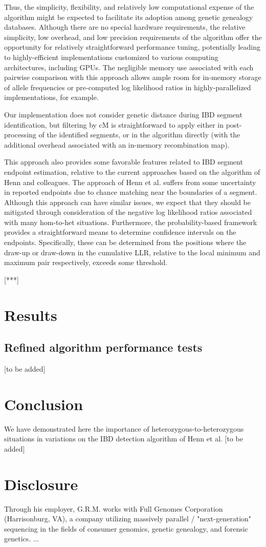\documentclass{article}
\begin{document}
Thus, the simplicity, flexibility, and relatively low computational expense of the algorithm might be expected to facilitate its adoption among genetic genealogy databases. Although there are no special hardware requirements, the relative simplicity, low overhead, and low precision requirements of the algorithm offer the opportunity for relatively straightforward performance tuning, potentially leading to highly-efficient implementations customized to various computing architectures, including GPUs. The negligible memory use associated with each pairwise comparison with this approach allows ample room for in-memory storage of allele frequencies or pre-computed log likelihood ratios in highly-parallelized implementations, for example.

Our implementation does not consider genetic distance during IBD segment identification, but filtering by cM is straightforward to apply either in post-processing of the identified segments, or in the algorithm directly (with the additional overhead associated with an in-memory recombination map).

This approach also provides some favorable features related to IBD segment endpoint estimation, relative to the current approaches based on the algorithm of Henn and colleagues. The approach of Henn et al. suffers from some uncertainty in reported endpoints due to chance matching near the boundaries of a segment. Although this approach can have similar issues, we expect that they should be mitigated through consideration of the negative log likelihood ratios associated with many hom-to-het situations. Furthermore, the probability-based framework provides a straightforward means to determine confidence intervals on the endpoints. Specifically, these can be determined from the positions where the draw-up or draw-down in the cumulative LLR, relative to the local minimum and maximum pair respectively, exceeds some threshold.

[***]

\section{Results}
\subsection{Refined algorithm performance tests}
[to be added]

\section{Conclusion}
We have demonstrated here the importance of heterozygous-to-heterozygous situations in variations on the IBD detection algorithm of Henn et al. [to be added] 

\section{Disclosure}
Through his employer, G.R.M. works with Full Genomes Corporation (Harrisonburg, VA), a company utilizing massively parallel / "next-generation" sequencing in the fields of consumer genomics, genetic genealogy, and forensic genetics.
...



\end{document}
